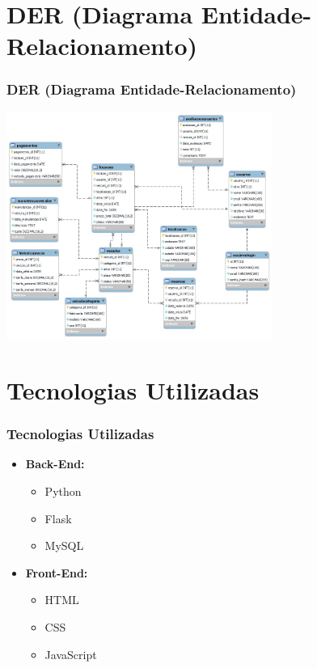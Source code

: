 \documentclass[aspectratio=169,xcolor=dvipsnames]{beamer}
\begin{document}
\section{DER (Diagrama Entidade-Relacionamento)}
\begin{frame}
\frametitle{DER (Diagrama Entidade-Relacionamento)}
\begin{center}
    \includegraphics[width=0.65\textwidth]{images/DER.jpg} 
\end{center}
\end{frame}

\section{Tecnologias Utilizadas}
\begin{frame}
\frametitle{Tecnologias Utilizadas}
\begin{itemize}
    \item \textbf{Back-End:}
    \begin{itemize}
        \item Python
        \item Flask
        \item MySQL
    \end{itemize}
    \item \textbf{Front-End:}
    \begin{itemize}
        \item HTML
        \item CSS
        \item JavaScript
    \end{itemize}
\end{itemize}
\end{frame}
\end{document}
